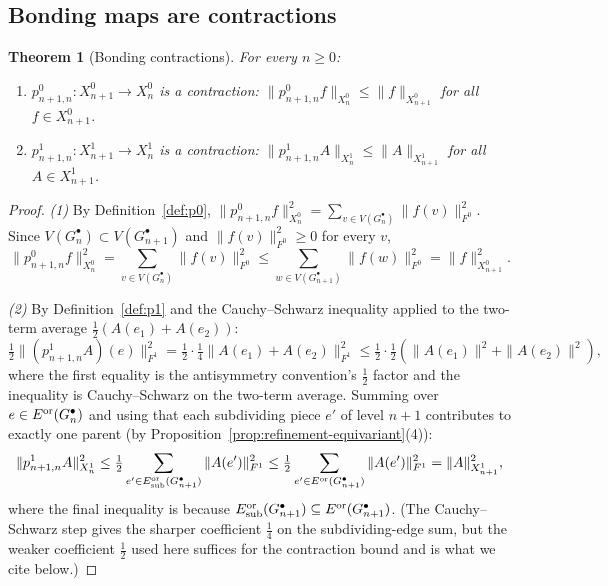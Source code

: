 \documentclass[11pt, a4paper]{amsart}
\newtheorem{theorem}{Theorem}[section]
\theoremstyle{definition}
\begin{document}
\subsection{Bonding maps are contractions}

\begin{theorem}[Bonding contractions]
\label{thm:bonding}
For every $n \geq 0$:
\begin{enumerate}
\item $p_{n+1, n}^0 \colon X_{n+1}^0 \to X_n^0$ is a contraction:
  $\|p_{n+1, n}^0 f\|_{X_n^0} \leq \|f\|_{X_{n+1}^0}$ for all
  $f \in X_{n+1}^0$.
\item $p_{n+1, n}^1 \colon X_{n+1}^1 \to X_n^1$ is a contraction:
  $\|p_{n+1, n}^1 A\|_{X_n^1} \leq \|A\|_{X_{n+1}^1}$ for all
  $A \in X_{n+1}^1$.
\end{enumerate}
\end{theorem}

\begin{proof}
\emph{(1)} By Definition~\ref{def:p0},
$\|p_{n+1, n}^0 f\|_{X_n^0}^2 = \sum_{v \in V(G_n^\bullet)}
\|f(v)\|_{F^0}^2$. Since $V(G_n^\bullet) \subset
V(G_{n+1}^\bullet)$ and $\|f(v)\|_{F^0}^2 \geq 0$ for every $v$,
\[
  \|p_{n+1, n}^0 f\|_{X_n^0}^2 = \sum_{v \in V(G_n^\bullet)}
    \|f(v)\|_{F^0}^2 \leq \sum_{w \in V(G_{n+1}^\bullet)}
    \|f(w)\|_{F^0}^2 = \|f\|_{X_{n+1}^0}^2.
\]

\emph{(2)} By Definition~\ref{def:p1} and the Cauchy--Schwarz
inequality applied to the two-term average $\tfrac{1}{2}(A(e_1) +
A(e_2))$:
\[
  \tfrac{1}{2}\|(p_{n+1, n}^1 A)(e)\|_{F^1}^2
  = \tfrac{1}{2} \cdot \tfrac{1}{4} \|A(e_1) + A(e_2)\|_{F^1}^2
  \leq \tfrac{1}{2} \cdot \tfrac{1}{2} (\|A(e_1)\|^2 + \|A(e_2)\|^2),
\]
where the first equality is the antisymmetry convention's
$\tfrac{1}{2}$ factor and the inequality is Cauchy--Schwarz on the
two-term average. Summing over $e \in E^{\rm or}(G_n^\bullet)$
and using that each subdividing piece $e'$ of level $n+1$
contributes to exactly one parent (by
Proposition~\ref{prop:refinement-equivariant}(4)):
\[
  \|p_{n+1, n}^1 A\|_{X_n^1}^2
  \leq \tfrac{1}{2} \sum_{e' \in E^{\rm or}_{\rm sub}(G_{n+1}^
    \bullet)} \|A(e')\|^2_{F^1}
  \leq \tfrac{1}{2} \sum_{e' \in E^{\rm or}(G_{n+1}^\bullet)}
    \|A(e')\|^2_{F^1}
  = \|A\|_{X_{n+1}^1}^2,
\]
where the final inequality is because $E^{\rm or}_{\rm sub}
(G_{n+1}^\bullet) \subseteq E^{\rm or}(G_{n+1}^\bullet)$.
(The Cauchy--Schwarz step gives the sharper coefficient
$\tfrac{1}{4}$ on the subdividing-edge sum, but the weaker
coefficient $\tfrac{1}{2}$ used here suffices for the
contraction bound and is what we cite below.)
\end{proof}
\end{document}
